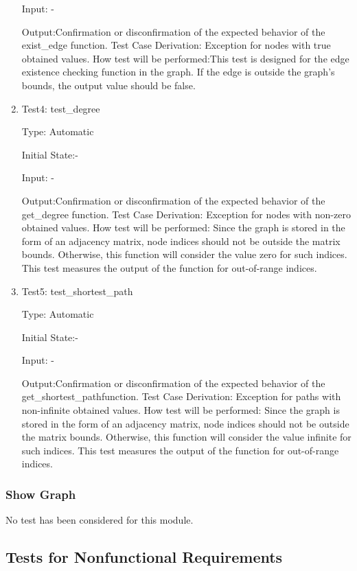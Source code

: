 \documentclass[12pt, titlepage]{article}
\begin{document}
\begin{enumerate}
Input: -
					
Output:Confirmation or disconfirmation of the expected behavior of the {exist\_edge} function.
Test Case Derivation: Exception for nodes with true obtained values.
How test will be performed:This test is designed for the edge existence checking function in the graph. If the edge is outside the graph's bounds, the output value should be false.
							
\item{Test4: test\_degree}

Type: Automatic
					
Initial State:-
					
Input: -
					
Output:Confirmation or disconfirmation of the expected behavior of the {get\_degree }function.
Test Case Derivation: Exception for nodes with non-zero obtained values.
How test will be performed: Since the graph is stored in the form of an adjacency matrix, node indices should not be outside the matrix bounds. Otherwise, this function will consider the value zero for such indices. This test measures the output of the function for out-of-range indices.
					


\item{Test5: test\_shortest\_path}

Type: Automatic
					
Initial State:-
					
Input: -
					
Output:Confirmation or disconfirmation of the expected behavior of the {get\_shortest\_path}function.
Test Case Derivation: Exception for paths with non-infinite obtained values.
How test will be performed: Since the graph is stored in the form of an adjacency matrix, node indices should not be outside the matrix bounds. Otherwise, this function will consider the value infinite for such indices. This test measures the output of the function for out-of-range indices.
				



    
\end{enumerate}

\subsubsection{Show Graph}
No test has been considered for this module.

\subsection{Tests for Nonfunctional Requirements}
\end{document}
